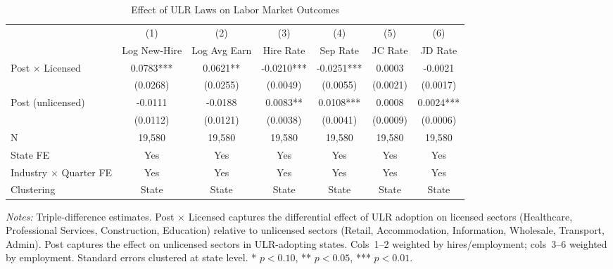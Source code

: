 \begin{table}[H]
\centering
\caption{Effect of ULR Laws on Labor Market Outcomes}
\label{tab:main}
\begin{adjustbox}{max width=\textwidth}
\begin{tabular}{lcccccc}
\toprule
  & (1) & (2) & (3) & (4) & (5) & (6) \\
  & Log New-Hire & Log Avg Earn & Hire Rate & Sep Rate & JC Rate & JD Rate \\
\midrule
Post $\times$ Licensed & 0.0783*** & 0.0621** & -0.0210*** & -0.0251*** & 0.0003 & -0.0021 \\
  & (0.0268) & (0.0255) & (0.0049) & (0.0055) & (0.0021) & (0.0017) \\
\addlinespace
Post (unlicensed) & -0.0111 & -0.0188 & 0.0083** & 0.0108*** & 0.0008 & 0.0024*** \\
  & (0.0112) & (0.0121) & (0.0038) & (0.0041) & (0.0009) & (0.0006) \\
\midrule
N & 19,580 & 19,580 & 19,580 & 19,580 & 19,580 & 19,580 \\
State FE & Yes & Yes & Yes & Yes & Yes & Yes \\
Industry $\times$ Quarter FE & Yes & Yes & Yes & Yes & Yes & Yes \\
Clustering & State & State & State & State & State & State \\
\bottomrule
\end{tabular}
\end{adjustbox}

\vspace{0.5em}
{\small \emph{Notes:} Triple-difference estimates. Post ${\times}$ Licensed captures the differential effect of ULR adoption on licensed sectors (Healthcare, Professional Services, Construction, Education) relative to unlicensed sectors (Retail, Accommodation, Information, Wholesale, Transport, Admin). Post captures the effect on unlicensed sectors in ULR-adopting states. Cols~1--2 weighted by hires/employment; cols~3--6 weighted by employment. Standard errors clustered at state level. * $p{<}0.10$, ** $p{<}0.05$, *** $p{<}0.01$.}
\end{table}


